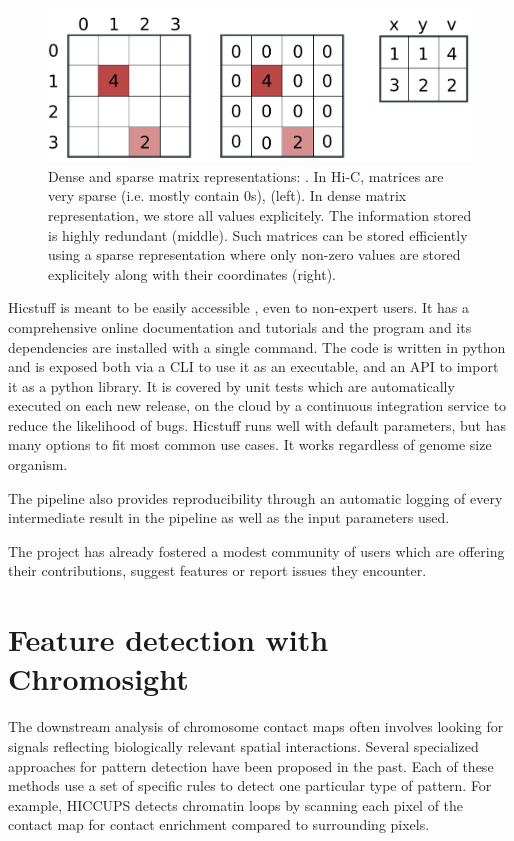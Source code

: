 \begin{figure}[htb]
    \includegraphics[width=\textwidth]{Parts/Part02/gfx/hicstuff/dense_sparse.pdf}
    \caption[Dense and sparse matrix representations.]{Dense and sparse matrix representations: . In Hi-C, matrices are very sparse (i.e. mostly contain 0s), (left). In dense matrix representation, we store all values explicitely. The information stored is highly redundant (middle). Such matrices can be stored efficiently using a sparse representation where only non-zero values are stored explicitely along with their coordinates (right).}
    \label{fig:02-01:sparse}
\end{figure}

Hicstuff is meant to be easily accessible \cite{matthey-doretSimpleLibraryPipeline2021}, even to non-expert users. It has a comprehensive online documentation and tutorials and the program and its dependencies are installed with a single command. The code is written in python and is exposed both via a \acrfull{CLI} to use it as an executable, and an \acrfull{API} to import it as a python library. It is covered by unit tests which are automatically executed on each new release, on the cloud by a continuous integration service to reduce the likelihood of bugs. Hicstuff runs well with default parameters, but has many options to fit most common use cases. It works regardless of genome size organism.

The pipeline also provides reproducibility through an automatic logging of every intermediate result in the pipeline as well as the input parameters used.

The project has already fostered a modest community of users which are offering their contributions, suggest features or report issues they encounter.

\FloatBarrier
\section{Feature detection with Chromosight}

The downstream analysis of chromosome contact maps often involves looking for signals reflecting biologically relevant spatial interactions. Several specialized approaches for pattern detection have been proposed in the past. Each of these methods use a set of specific rules to detect one particular type of pattern. For example, HICCUPS \cite{rao3DMapHuman2014} detects chromatin loops by scanning each pixel of the contact map for contact enrichment compared to surrounding pixels.

